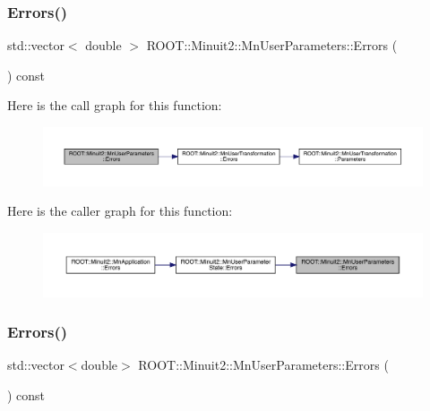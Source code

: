 \subsubsection{\texorpdfstring{Errors()}{Errors()}\hspace{0.1cm}{\footnotesize\ttfamily [1/2]}}
{\footnotesize\ttfamily std\+::vector$<$ double $>$ R\+O\+O\+T\+::\+Minuit2\+::\+Mn\+User\+Parameters\+::\+Errors (\begin{DoxyParamCaption}{ }\end{DoxyParamCaption}) const}

Here is the call graph for this function\+:\nopagebreak
\begin{figure}[H]
\begin{center}
\leavevmode
\includegraphics[width=350pt]{d6/d10/classROOT_1_1Minuit2_1_1MnUserParameters_a7cae98f6146725427e852655cee7a857_cgraph}
\end{center}
\end{figure}
Here is the caller graph for this function\+:\nopagebreak
\begin{figure}[H]
\begin{center}
\leavevmode
\includegraphics[width=350pt]{d6/d10/classROOT_1_1Minuit2_1_1MnUserParameters_a7cae98f6146725427e852655cee7a857_icgraph}
\end{center}
\end{figure}
\mbox{\label{classROOT_1_1Minuit2_1_1MnUserParameters_abcc81c5cff7f9af0d10e2622c5d715c7}} 
\subsubsection{\texorpdfstring{Errors()}{Errors()}\hspace{0.1cm}{\footnotesize\ttfamily [2/2]}}
{\footnotesize\ttfamily std\+::vector$<$double$>$ R\+O\+O\+T\+::\+Minuit2\+::\+Mn\+User\+Parameters\+::\+Errors (\begin{DoxyParamCaption}{ }\end{DoxyParamCaption}) const}

